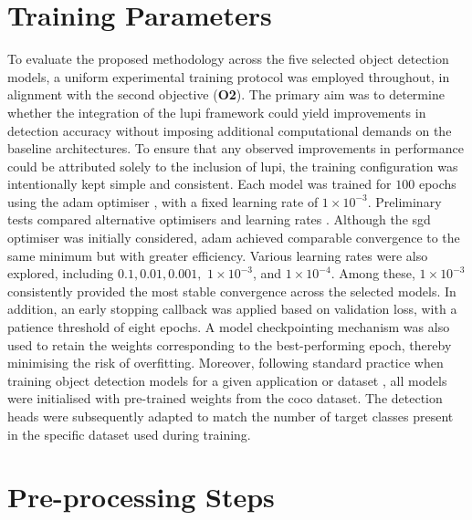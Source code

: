 \section{Training Parameters}
\label{sec:4_training_params}

To evaluate the proposed methodology across the five selected object detection models, a uniform experimental training protocol was employed throughout, in alignment with the second objective (\textbf{O2}). The primary aim was to determine whether the integration of the \gls{lupi} framework could yield improvements in detection accuracy without imposing additional computational demands on the baseline architectures. To ensure that any observed improvements in performance could be attributed solely to the inclusion of \gls{lupi}, the training configuration was intentionally kept simple and consistent. Each model was trained for $100$ epochs using the \gls{adam} optimiser \cite{adam_optimizer}, with a fixed learning rate of \(1 \times 10^{-3}\).
Preliminary tests compared alternative optimisers and learning rates \cite{sgd_optimizer}. Although the \gls{sgd} optimiser was initially considered, \gls{adam} achieved comparable convergence to the same minimum but with greater efficiency. Various learning rates were also explored, including $0.1, 0.01, 0.001,$ \(1 \times 10^{-3}\), and \(1 \times 10^{-4}\). Among these, \(1 \times 10^{-3}\) consistently provided the most stable convergence across the selected models. 
In addition, an early stopping callback was applied based on validation loss, with a patience threshold of eight epochs. A model checkpointing mechanism was also used to retain the weights corresponding to the best-performing epoch, thereby minimising the risk of overfitting.
Moreover, following standard practice when training object detection models for a given application or dataset \cite{yolov12, soda_dataset, fasterrcnn, yolov10}, all models were initialised with pre-trained weights from the \gls{coco} dataset. The detection heads were subsequently adapted to match the number of target classes present in the specific dataset used during training.

\section{Pre-processing Steps}
\label{sec:4_preprocessing}

